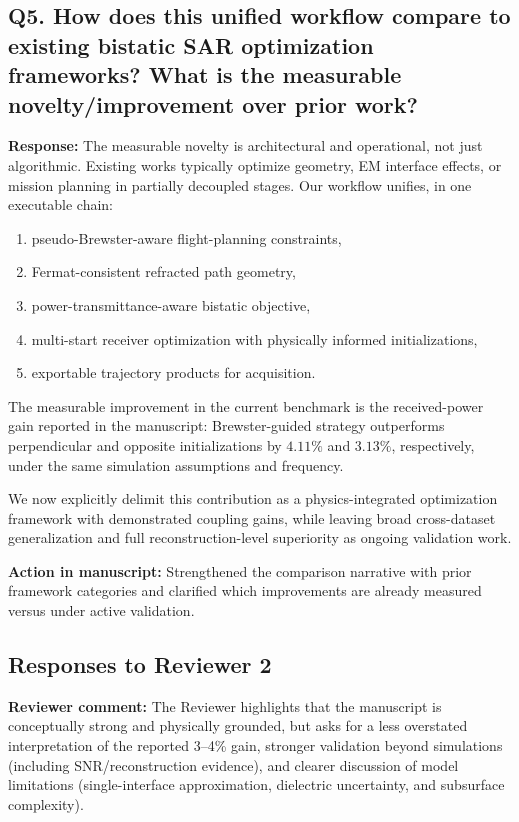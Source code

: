 \documentclass[11pt]{article}
\begin{document}
\subsection*{Q5. How does this unified workflow compare to existing bistatic SAR optimization frameworks? What is the measurable novelty/improvement over prior work?}
\textbf{Response:} The measurable novelty is architectural and operational, not just algorithmic. Existing works typically optimize geometry, EM interface effects, or mission planning in partially decoupled stages. Our workflow unifies, in one executable chain:
\begin{enumerate}[label=(\roman*)]
\item pseudo-Brewster-aware flight-planning constraints,
\item Fermat-consistent refracted path geometry,
\item power-transmittance-aware bistatic objective,
\item multi-start receiver optimization with physically informed initializations,
\item exportable trajectory products for acquisition.
\end{enumerate}
The measurable improvement in the current benchmark is the received-power gain reported in the manuscript: Brewster-guided strategy outperforms perpendicular and opposite initializations by $4.11\%$ and $3.13\%$, respectively, under the same simulation assumptions and frequency.

We now explicitly delimit this contribution as a physics-integrated optimization framework with demonstrated coupling gains, while leaving broad cross-dataset generalization and full reconstruction-level superiority as ongoing validation work.

\textbf{Action in manuscript:} Strengthened the comparison narrative with prior framework categories and clarified which improvements are already measured versus under active validation.

\subsection*{Responses to Reviewer 2}

\textbf{Reviewer comment:} The Reviewer highlights that the manuscript is conceptually strong and physically grounded, but asks for a less overstated interpretation of the reported 3--4\% gain, stronger validation beyond simulations (including SNR/reconstruction evidence), and clearer discussion of model limitations (single-interface approximation, dielectric uncertainty, and subsurface complexity).
\end{document}
